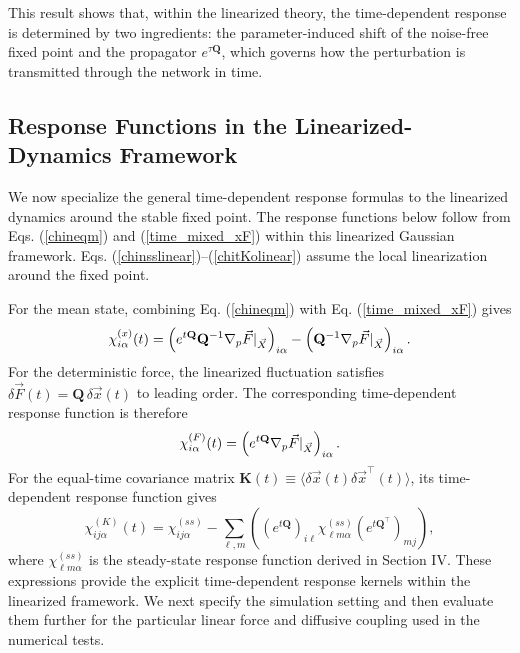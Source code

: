 This result shows that, within the linearized theory, the time-dependent response is determined by two ingredients: the parameter-induced shift of the noise-free fixed point and the propagator $e^{\tau\mathbf{Q}}$, which governs how the perturbation is transmitted through the network in time.
\subsection{Response Functions in the Linearized-Dynamics Framework}
\quad We now specialize the general time-dependent response formulas to the linearized dynamics around the stable fixed point. The response functions below follow from Eqs. (\ref{chineqm}) and (\ref{time_mixed_xF}) within this linearized Gaussian framework. Eqs. (\ref{chinsslinear})--(\ref{chitKolinear}) assume the local linearization around the fixed point.\par
For the mean state, combining Eq. (\ref{chineqm}) with Eq. (\ref{time_mixed_xF}) gives
\begin{equation}
    \chi_{i\alpha}^{(x)}(t)=\left(e^{t{\bf Q}}{\bf Q}^{-1} \nabla_p{\vec { F}}|_{\vec X} \right)_{i\alpha}-\left({\bf Q}^{-1} \nabla_p{\vec { F}} |_{\vec X}\right)_{i\alpha}. \label{chinsslinear}
\end{equation}
For the deterministic force, the linearized fluctuation satisfies $\delta \vec{F}(t)=\mathbf{Q}\,\delta \vec{x}(t)$ to leading order. The corresponding time-dependent response function is therefore
\begin{equation}
    \chi_{i\alpha}^{(F)}(t)=\left(e^{t{\bf Q}}\nabla_p{\vec { F}}|_{\vec X} \right)_{i\alpha}.
    \label{chitforcelinear}
\end{equation}
For the equal-time covariance matrix $\mathbf{K}(t)\equiv \langle \delta \vec{x}(t) \delta \vec{x}^\intercal(t) \rangle$, its time-dependent response function gives
\begin{equation}
    \chi_{ij\alpha}^{(K)}(t) = \chi_{ij\alpha}^{(ss)} - \sum_{\ell,m} \left((e^{t\mathbf{Q}})_{i\ell}\chi_{\ell m\alpha}^{(ss)}(e^{t\mathbf{Q}^\intercal})_{mj}\right),
    \label{chitKolinear}
\end{equation}
where $\chi_{\ell m\alpha}^{(ss)}$ is the steady-state response function derived in Section IV. These expressions provide the explicit time-dependent response kernels within the linearized framework. We next specify the simulation setting and then evaluate them further for the particular linear force and diffusive coupling used in the numerical tests.
